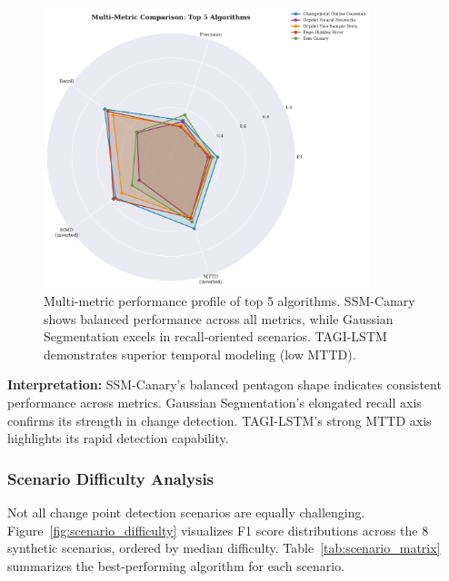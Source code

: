 \documentclass[journal,article,submit,pdftex,moreauthors]{Definitions/mdpi}
\begin{document}
\begin{figure}[ht]
\centering
\includegraphics[width=0.85\textwidth]{figures/fig_radar_metrics.pdf}
\caption{Multi-metric performance profile of top 5 algorithms. SSM-Canary shows balanced performance across all metrics, while Gaussian Segmentation excels in recall-oriented scenarios. TAGI-LSTM demonstrates superior temporal modeling (low MTTD).}
\label{fig:radar_metrics}
\end{figure}

\textbf{Interpretation:} SSM-Canary's balanced pentagon shape indicates consistent performance across metrics. Gaussian Segmentation's elongated recall axis confirms its strength in change detection. TAGI-LSTM's strong MTTD axis highlights its rapid detection capability.


\subsubsection{Scenario Difficulty Analysis}

Not all change point detection scenarios are equally challenging. Figure~\ref{fig:scenario_difficulty} visualizes F1 score distributions across the 8 synthetic scenarios, ordered by median difficulty. Table~\ref{tab:scenario_matrix} summarizes the best-performing algorithm for each scenario.
\end{document}

